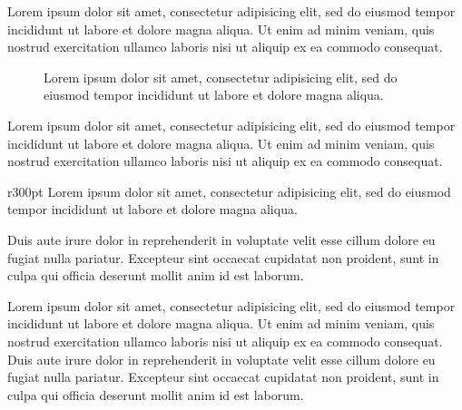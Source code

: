 \documentclass[a4paper, 12pt]{report}
\begin{document}
Lorem ipsum dolor sit amet, consectetur adipisicing elit, sed do eiusmod
tempor incididunt ut labore et dolore magna aliqua. Ut enim ad minim veniam,
quis nostrud exercitation ullamco laboris nisi ut aliquip ex ea commodo consequat.

\begin{figure}[h]
	\centering
	\caption{
		Lorem ipsum dolor sit amet, consectetur adipisicing elit, sed do eiusmod
		tempor incididunt ut labore et dolore magna aliqua.
	}
\end{figure}

Lorem ipsum dolor sit amet, consectetur adipisicing elit, sed do eiusmod
tempor incididunt ut labore et dolore magna aliqua. Ut enim ad minim veniam,
quis nostrud exercitation ullamco laboris nisi ut aliquip ex ea commodo consequat.

\begin{wrapfigure}{r}{300pt}
	\centering
	\vspace{-1.5\baselineskip}
	{\footnotesize
		Lorem ipsum dolor sit amet, consectetur adipisicing elit, sed do eiusmod
		tempor incididunt ut labore et dolore magna aliqua.
	}
	\vspace{-1\baselineskip}
\end{wrapfigure}

Duis aute irure dolor in reprehenderit in voluptate velit esse
cillum dolore eu fugiat nulla pariatur. Excepteur sint occaecat cupidatat non
proident, sunt in culpa qui officia deserunt mollit anim id est laborum.

Lorem ipsum dolor sit amet, consectetur adipisicing elit, sed do eiusmod
tempor incididunt ut labore et dolore magna aliqua. Ut enim ad minim veniam,
quis nostrud exercitation ullamco laboris nisi ut aliquip ex ea commodo
consequat. Duis aute irure dolor in reprehenderit in voluptate velit esse
cillum dolore eu fugiat nulla pariatur. Excepteur sint occaecat cupidatat non
proident, sunt in culpa qui officia deserunt mollit anim id est laborum.
\end{document}

